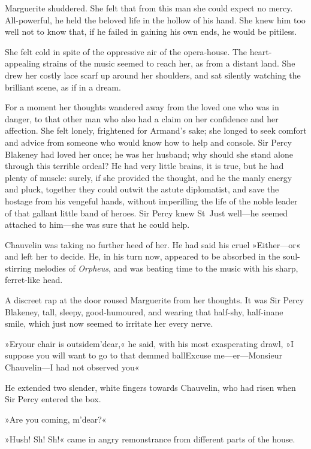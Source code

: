 Marguerite shuddered. She felt that from this man she could expect no mercy. All-powerful, he held the beloved life in the hollow of his hand. She knew him too well not to know that, if he failed in gaining his own ends, he would be pitiless.

She felt cold in spite of the oppressive air of the opera-house. The heart-appealing strains of the music seemed to reach her, as from a distant land. She drew her costly lace scarf up around her shoulders, and sat silently watching the brilliant scene, as if in a dream.

For a moment her thoughts wandered away from the loved one who was in danger, to that other man who also had a claim on her confidence and her affection. She felt lonely, frightened for Armand's sake; she longed to seek comfort and advice from someone who would know how to help and console. Sir Percy Blakeney had loved her once; he was her husband; why should she stand alone through this terrible ordeal? He had very little brains, it is true, but he had plenty of muscle: surely, if she provided the thought, and he the manly energy and pluck, together they could outwit the astute diplomatist, and save the hostage from his vengeful hands, without imperilling the life of the noble leader of that gallant little band of heroes. Sir Percy knew St~Just well—he seemed attached to him—she was sure that he could help.

Chauvelin was taking no further heed of her. He had said his cruel »Either—or\longdash« and left her to decide. He, in his turn now, appeared to be absorbed in the soul-stirring melodies of \textit{Orpheus}, and was beating time to the music with his sharp, ferret-like head.

A discreet rap at the door roused Marguerite from her thoughts. It was Sir Percy Blakeney, tall, sleepy, good-humoured, and wearing that half-shy, half-inane smile, which just now seemed to irritate her every nerve.

»Er\textellipsis \allowbreak  your chair is outside\textellipsis \allowbreak  m'dear,« he said, with his most exasperating drawl, »I suppose you will want to go to that demmed ball\textellipsis \allowbreak  Excuse me—er—Monsieur Chauvelin—I had not observed you\textellipsis«

He extended two slender, white fingers towards Chauvelin, who had risen when Sir Percy entered the box.

»Are you coming, m'dear?«

»Hush! Sh! Sh!« came in angry remonstrance from different parts of the house.

